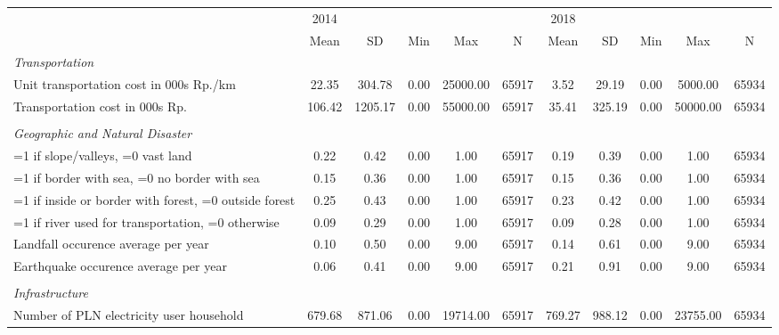 \begin{tabular}{l*{2}{ccccc}}
\toprule
                &     2014&         &         &         &         &     2018&         &         &         &         \\
                &     Mean&       SD&      Min&      Max&        N&     Mean&       SD&      Min&      Max&        N\\
\midrule
\emph{Transportation}&         &         &         &         &         &         &         &         &         &         \\
Unit transportation cost in 000s Rp./km&    22.35&   304.78&     0.00& 25000.00&    65917&     3.52&    29.19&     0.00&  5000.00&    65934\\
Transportation cost in 000s Rp.&   106.42&  1205.17&     0.00& 55000.00&    65917&    35.41&   325.19&     0.00& 50000.00&    65934\\
\vspace{0.1em} \\ \emph{Geographic and Natural Disaster}&         &         &         &         &         &         &         &         &         &         \\
=1 if slope/valleys, =0 vast land&     0.22&     0.42&     0.00&     1.00&    65917&     0.19&     0.39&     0.00&     1.00&    65934\\
=1 if border with sea, =0 no border with sea&     0.15&     0.36&     0.00&     1.00&    65917&     0.15&     0.36&     0.00&     1.00&    65934\\
=1 if inside or border with forest, =0 outside forest&     0.25&     0.43&     0.00&     1.00&    65917&     0.23&     0.42&     0.00&     1.00&    65934\\
=1 if river used for transportation, =0 otherwise&     0.09&     0.29&     0.00&     1.00&    65917&     0.09&     0.28&     0.00&     1.00&    65934\\
Landfall occurence average per year&     0.10&     0.50&     0.00&     9.00&    65917&     0.14&     0.61&     0.00&     9.00&    65934\\
Earthquake occurence average per year&     0.06&     0.41&     0.00&     9.00&    65917&     0.21&     0.91&     0.00&     9.00&    65934\\
\vspace{0.1em} \\ \emph{Infrastructure}&         &         &         &         &         &         &         &         &         &         \\
Number of PLN electricity user household&   679.68&   871.06&     0.00& 19714.00&    65917&   769.27&   988.12&     0.00& 23755.00&    65934\\

\end{tabular}

